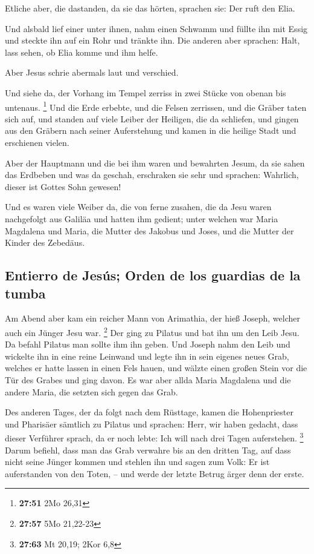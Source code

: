  Etliche aber, die dastanden, da sie das hörten, sprachen
sie: Der ruft den Elia.

 Und alsbald lief einer unter ihnen, nahm einen Schwamm
und füllte ihn mit Essig und steckte ihn auf ein Rohr und tränkte ihn.
 Die anderen aber sprachen: Halt, lass sehen, ob Elia
komme und ihm helfe.

 Aber Jesus schrie abermals laut und verschied.

 Und siehe da, der Vorhang im Tempel zerriss in zwei
Stücke von obenan bis untenaus. \footnote{\textbf{27:51} 2Mo 26,31}
 Und die Erde erbebte, und die Felsen zerrissen, und die
Gräber taten sich auf, und standen auf viele Leiber der Heiligen, die da
schliefen,  und gingen aus den Gräbern nach seiner
Auferstehung und kamen in die heilige Stadt und erschienen vielen.

 Aber der Hauptmann und die bei ihm waren und bewahrten
Jesum, da sie sahen das Erdbeben und was da geschah, erschraken sie sehr
und sprachen: Wahrlich, dieser ist Gottes Sohn gewesen!

 Und es waren viele Weiber da, die von ferne zusahen, die
da Jesu waren nachgefolgt aus Galiläa und hatten ihm gedient;
 unter welchen war Maria Magdalena und Maria, die Mutter
des Jakobus und Joses, und die Mutter der Kinder des Zebedäus.

\hypertarget{entierro-de-jesuxfas-orden-de-los-guardias-de-la-tumba}{%
\subsection{Entierro de Jesús; Orden de los guardias de la
tumba}\label{entierro-de-jesuxfas-orden-de-los-guardias-de-la-tumba}}

 Am Abend aber kam ein reicher Mann von Arimathia, der
hieß Joseph, welcher auch ein Jünger Jesu war. \footnote{\textbf{27:57}
  5Mo 21,22-23}  Der ging zu Pilatus und bat ihn um den
Leib Jesu. Da befahl Pilatus man sollte ihm ihn geben. 
Und Joseph nahm den Leib und wickelte ihn in eine reine Leinwand
 und legte ihn in sein eigenes neues Grab, welches er
hatte lassen in einen Fels hauen, und wälzte einen großen Stein vor die
Tür des Grabes und ging davon.  Es war aber allda Maria
Magdalena und die andere Maria, die setzten sich gegen das Grab.

 Des anderen Tages, der da folgt nach dem Rüsttage, kamen
die Hohenpriester und Pharisäer sämtlich zu Pilatus  und
sprachen: Herr, wir haben gedacht, dass dieser Verführer sprach, da er
noch lebte: Ich will nach drei Tagen auferstehen. \footnote{\textbf{27:63}
  Mt 20,19; 2Kor 6,8}  Darum befiehl, dass man das Grab
verwahre bis an den dritten Tag, auf dass nicht seine Jünger kommen und
stehlen ihn und sagen zum Volk: Er ist auferstanden von den Toten, --
und werde der letzte Betrug ärger denn der erste.

